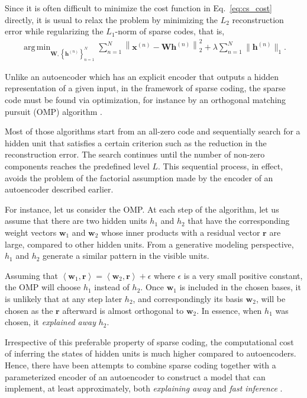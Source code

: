 \documentclass[dissertation,nocontribution]{aaltoseries}
\newcommand{\vect}[1]{\mathbf{#1}}
\newcommand{\matr}[1]{\mathbf{#1}}
\newcommand{\vh}[0]{\vect{h}}
\newcommand{\vx}[0]{\vect{x}}
\newcommand{\vr}[0]{\vect{r}}
\newcommand{\vw}[0]{\vect{w}}
\newcommand{\mW}[0]{\matr{W}}
\DeclareMathOperator*{\argmin}{arg\,min}
\begin{document}
Since it is often difficult to minimize the cost function in
Eq.~\eqref{eq:cs_cost} directly, it is usual to relax the
problem by minimizing the $L_2$ reconstruction error while
regularizing the $L_1$-norm of sparse codes, that is,
\begin{align}
    \label{eq:sp_cost}
    \argmin_{\mW, \left\{ \vh^{(n)} \right\}_{n=1}^N }
    \sum_{n=1}^N \left\| \vx^{(n)} - \mW \vh^{(n)}
    \right\|_2^2 + \lambda \sum_{n=1}^N \| \vh^{(n)} \|_1.
\end{align}

Unlike an autoencoder which has an explicit encoder that
outputs a hidden representation of a given input, in the
framework of sparse coding, the sparse code must be found
via optimization, for instance by an orthogonal matching
pursuit (OMP) algorithm \citep{Davis1994}.

Most of those algorithms 
start from an all-zero
code and sequentially search for a hidden unit that
satisfies a certain criterion such as the reduction in the
reconstruction error. The search continues until the number
of non-zero components reaches the predefined level $L$.
This sequential process, in effect, avoids the problem of
the factorial assumption made by the encoder of an
autoencoder described earlier. 

For instance, let us consider the OMP. At each step of the
algorithm, let us assume that there are two hidden units
$h_1$ and $h_2$ that have the corresponding weight vectors
$\vw_1$ and $\vw_2$ whose inner products with a residual
vector $\vr$ are large, compared to other hidden units. From
a generative modeling perspective, $h_1$ and $h_2$ generate
a similar pattern in the visible units.

Assuming that $\left< \vw_1, \vr\right> = \left< \vw_2,
\vr\right> + \epsilon$ where $\epsilon$ is a very small
positive constant, the OMP will choose $h_1$ instead of $h_2$. Once
$\vw_1$ is included in the chosen bases, it is unlikely that
at any step later $h_2$, and correspondingly its basis
$\vw_2$, will be chosen as the $\vr$ afterward is almost
orthogonal to $\vw_2$. In essence, when $h_1$ was chosen, it
\textit{explained away} $h_2$.

Irrespective of this preferable property of sparse coding,
the computational cost of inferring the states of hidden
units is much higher compared to autoencoders. Hence, there
have been attempts to combine sparse coding together with a
parameterized encoder of an autoencoder to construct a model
that can implement, at least approximately, both
\textit{explaining away} and \textit{fast inference}
\citep[see, e.g.,][]{Kavukcuoglu2010,Gregor2010}.
\end{document}
